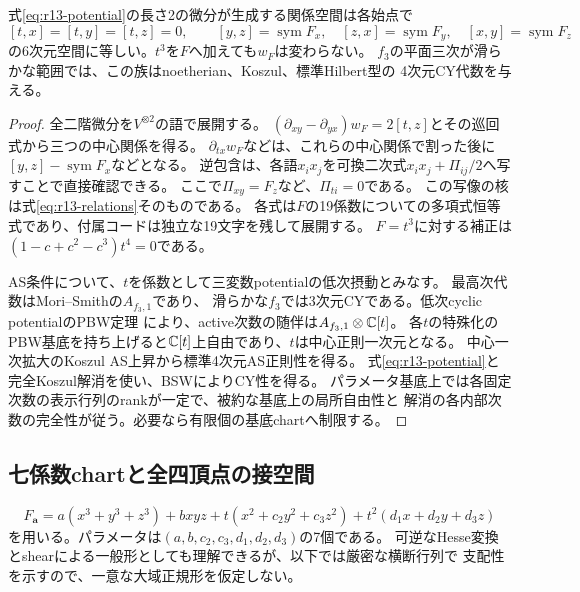 \begin{proposition}\label{prop:potential-presentation}
式\eqref{eq:r13-potential}の長さ2の微分が生成する関係空間は各始点で
\begin{equation}\label{eq:r13-relations}
 [t,x]=[t,y]=[t,z]=0,\qquad
 [y,z]=\operatorname{sym}F_x,\quad
 [z,x]=\operatorname{sym}F_y,\quad
 [x,y]=\operatorname{sym}F_z
\end{equation}
の6次元空間に等しい。$t^3$を$F$へ加えても$w_F$は変わらない。
$f_3$の平面三次が滑らかな範囲では、この族はnoetherian、Koszul、標準Hilbert型の
4次元CY代数を与える。
\end{proposition}
\begin{proof}
全二階微分を$V^{\otimes2}$の語で展開する。
$(\partial_{xy}-\partial_{yx})w_F=2[t,z]$とその巡回式から三つの中心関係を得る。
$\partial_{tx}w_F$などは、これらの中心関係で割った後に
$[y,z]-\operatorname{sym}F_x$などとなる。
逆包含は、各語$x_ix_j$を可換二次式$x_ix_j+\Pi_{ij}/2$へ写すことで直接確認できる。
ここで$\Pi_{xy}=F_z$など、$\Pi_{ti}=0$である。
この写像の核は式\eqref{eq:r13-relations}そのものである。
各式は$F$の19係数についての多項式恒等式であり、付属コードは独立な19文字を残して展開する。
$F=t^3$に対する補正は$(1-c+c^2-c^3)t^4=0$である。

AS条件について、$t$を係数として三変数potentialの低次摂動とみなす。
最高次代数はMori--Smith\cite[Theorem 4.2(1)]{MS}の$A_{f_3,1}$であり、
滑らかな$f_3$では3次元CYである。低次cyclic potentialのPBW定理
\cite[Proposition 7.3.1(ii)]{EG}により、active次数の随伴は$A_{f_3,1}\otimes\mathbb C[t]$。
各$t$の特殊化のPBW基底を持ち上げると$\mathbb C[t]$上自由であり、$t$は中心正則一次元となる。
中心一次拡大のKoszul AS上昇\cite{LBS}から標準4次元AS正則性を得る。
式\eqref{eq:r13-potential}と完全Koszul解消を使い、BSWによりCY性を得る。
パラメータ基底上では各固定次数の表示行列のrankが一定で、被約な基底上の局所自由性と
解消の各内部次数の完全性が従う。必要なら有限個の基底chartへ制限する。
\end{proof}

\subsection{七係数chartと全四頂点の接空間}
\begin{equation}\label{eq:seven-parameter}
 F_{\boldsymbol a}=a(x^3+y^3+z^3)+bxyz
       +t(x^2+c_2y^2+c_3z^2)
       +t^2(d_1x+d_2y+d_3z)
\end{equation}
を用いる。パラメータは$(a,b,c_2,c_3,d_1,d_2,d_3)$の7個である。
可逆なHesse変換とshearによる一般形としても理解できるが、以下では厳密な横断行列で
支配性を示すので、一意な大域正規形を仮定しない。

